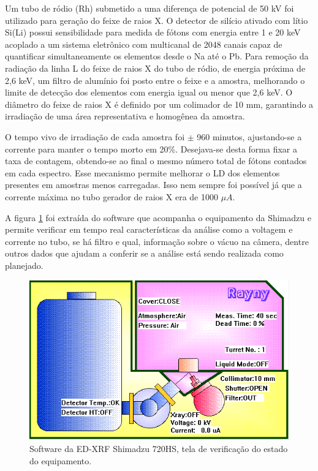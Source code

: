 Um tubo de ródio (Rh) submetido a uma diferença de potencial 
de 50 kV foi utilizado para geração do feixe de raios X.
O detector de silício ativado com lítio Si(Li) possui sensibilidade
para medida de fótons com energia entre 1 e 20 keV acoplado a um sistema 
eletrônico com multicanal de 2048 canais capaz de quantificar simultaneamente 
os elementos desde o Na até o Pb. Para remoção da radiação da linha L do feixe 
de raios X do tubo de ródio, de energia próxima de 2,6 keV, um filtro de 
alumínio foi posto entre o feixe e a amostra, melhorando o limite de detecção 
dos elementos com energia igual ou menor que 2,6 keV. O diâmetro do feixe de 
raios X é definido por um colimador de 10 mm, garantindo a irradiação de uma 
área representativa e homogênea da amostra. 

O tempo vivo de irradiação de cada amostra foi $\pm$ 960 minutos, ajustando-se 
a corrente para manter o tempo morto em 20\%. Desejava-se desta forma fixar a 
taxa de contagem, obtendo-se ao final o mesmo número total de fótons contados 
em cada espectro. Esse mecanismo permite melhorar o LD dos elementos presentes 
em amostras menos carregadas. Isso nem sempre foi possível já que a corrente 
máxima no tubo gerador de raios X era de 1000 $\mu A$. 

A figura \ref{fig:xrfed_software} foi extraída do software que acompanha o 
equipamento da Shimadzu e permite verificar em tempo real características
da análise como a voltagem e corrente no tubo, se há filtro e qual, 
informação sobre o vácuo na câmera, dentre outros dados que ajudam a conferir se 
a análise está sendo realizada como planejado. 

\begin{figure}[H]
  \centering
  \includegraphics[scale=0.4]{../inputs/images/edx_iag_monitor.png}
  \caption{Software da ED-XRF Shimadzu 720HS, tela de verificação 
           do estado do equipamento. \label{fig:xrfed_software}}
\end{figure}

